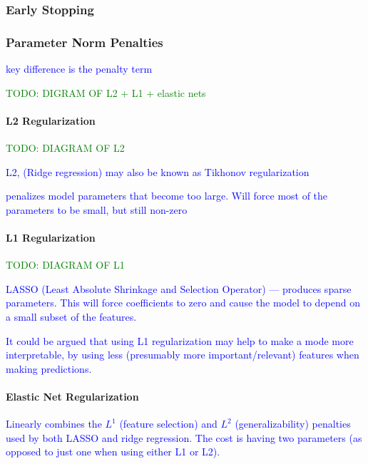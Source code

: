 \subsubsection{Early Stopping}


\subsubsection{Parameter Norm Penalties}

\textcolor{blue}{key difference is the penalty term}

\textcolor{green}{TODO: DIGRAM OF L2 + L1 + elastic nets}

\paragraph{L2 Regularization}

\textcolor{green}{TODO: DIAGRAM OF L2}

\textcolor{blue}{L2, ({Ridge regression}) may also be known as {Tikhonov regularization}}

\textcolor{blue}{penalizes model parameters that become too large. Will force most of the parameters to be small, but still non-zero}


\paragraph{L1 Regularization}

\textcolor{green}{TODO: DIAGRAM OF L1}

\textcolor{blue}{LASSO (Least Absolute Shrinkage and Selection Operator) --- produces sparse parameters. This will force coefficients to zero and cause the model to depend on a small subset of the features.}

\textcolor{blue}{It could be argued that using L1 regularization may help to make a mode more interpretable, by using less (presumably more important/relevant) features when making predictions.}


\paragraph{Elastic Net Regularization}

\textcolor{blue}{Linearly combines the $L^1$ (feature selection) and $L^2$ (generalizability) penalties used by both LASSO and ridge regression. The cost is having two parameters (as opposed to just one when using either L1 or L2).}

